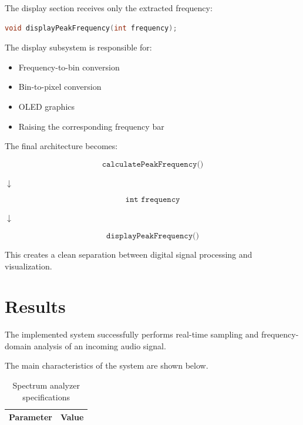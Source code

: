 \documentclass{article}
\begin{document}
\begin{center}
The display section receives only the extracted frequency:

\begin{lstlisting}[language=C++]
void displayPeakFrequency(int frequency);
\end{lstlisting}

The display subsystem is responsible for:

\begin{itemize}
    \item Frequency-to-bin conversion
    \item Bin-to-pixel conversion
    \item OLED graphics
    \item Raising the corresponding frequency bar
\end{itemize}

The final architecture becomes:

\begin{center}

\[
\boxed{
\texttt{calculatePeakFrequency()}
}
\]

$\downarrow$

\[
\boxed{
\texttt{int frequency}
}
\]

$\downarrow$

\[
\boxed{
\texttt{displayPeakFrequency()}
}
\]

\end{center}

This creates a clean separation between digital signal processing and visualization.

\newpage


\section{Results}

The implemented system successfully performs real-time sampling and frequency-domain analysis of an incoming audio signal.

The main characteristics of the system are shown below.

\begin{table}[H]
\centering
\caption{Spectrum analyzer specifications}
\begin{tabular}{|p{7cm}|p{5cm}|}
\hline
\textbf{Parameter} & \textbf{Value} \\
\hline


\end{tabular}
\end{table}
\end{center}
\end{document}
